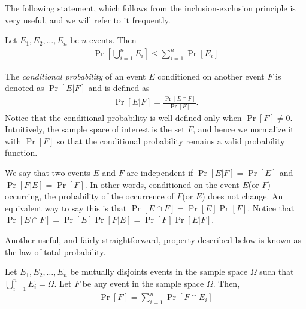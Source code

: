 The following statement, which follows from the inclusion-exclusion principle is very useful, and we will refer to it frequently.

\begin{fact}
	Let $E_1, E_2, \ldots, E_n$ be $n$ events. Then
	\begin{align*}
		\Pr\left[\bigcup_{i=1}^n E_i\right] \leq \sum_{i=1}^n \Pr[E_i]
	\end{align*}
\end{fact}

The \emph{conditional probability} of an event $E$ conditioned on another event
$F$ is denoted as $\Pr[E | F]$ and is defined as
\begin{align*}
	\Pr[E|F] = \frac{\Pr[E\cap F]}{\Pr[F]}.
\end{align*}
Notice that the conditional probability is well-defined only when
$\Pr[F] \neq 0$. Intuitively, the sample space of interest is the set $F$, and
hence we normalize it with $\Pr[F]$ so that the conditional probability remains
a valid probability function.

We say that two events $E$ and $F$ are independent if $\Pr[E|F] = \Pr[E]$ and
$\Pr[F|E] = \Pr[F]$. In other words, conditioned on the event $E$(or $F$)
occurring, the probability of the occurrence of $F$(or $E$) does not change. An
equivalent way to say this is that $\Pr[E\cap F] = \Pr[E]\Pr[F]$. Notice that
$\Pr[E\cap F] = \Pr[E]\Pr[F|E] = \Pr[F]\Pr[E|F]$.

Another useful, and fairly straightforward, property described below is known as
the law of total probability.

\begin{theorem}
	Let $E_1, E_2, \ldots, E_n$ be mutually disjoints events in the sample
        space $\Omega$ such that $\bigcup_{i=1}^n E_i = \Omega$. Let $F$ be any
        event in the sample space $\Omega$. Then,
	\begin{align*}
		\Pr[F] = \sum_{i=1}^n \Pr[F \cap E_i]
	\end{align*}
	\label{thm:tot-prob}
\end{theorem}

